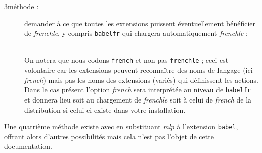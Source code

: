 \documentclass[a4paper,12pt,openright]{article}
\begin{document}
\begin{description}
\item[3\ieme méthode :]  demander à ce que toutes les extensions puissent éventuellement
bénéficier de \textit{frenchle}, y compris \texttt{babelfr} 
qui chargera automatiquement 
\textit{frenchle} :\\[.5em]
\rule{0pt}{1em}\hfill{}\hfill\rule{0pt}{1em}\\[.5em]
On notera que nous codons \texttt{french} et non pas \texttt{frenchle} ; ceci est volontaire
car les extensions peuvent reconnaître des noms de langage (ici \textsl{french})
mais pas les noms des extensions (variés) qui définissent les actions. Dans
le cas présent l’option \textsl{french} sera interprétée au niveau de 
\texttt{babelfr} et 
donnera lieu soit au chargement de \textit{frenchle} soit à celui de \textsl{french} de la distribution \textsl{\befr} si celui-ci existe
dans votre installation.
\end{description}

Une quatrième méthode existe avec \textsl{\befr} en substituant \textsl{mlp} à l’extension
\texttt{babel}, offrant alors d’autres possibilités mais cela n’est pas l’objet de
cette documentation.
\end{document}
